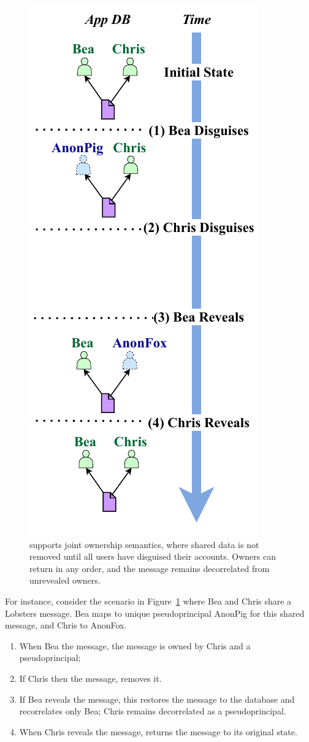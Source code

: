 \begin{figure}
    \centering
    \includegraphics[width=.4\textwidth]{figs/shared_hl}
    \caption[\sys supports joint ownership semantics when disguising shared data.]{\sys supports joint ownership semantics, where shared data is not
    removed until all users have disguised their accounts. Owners can return in
    any order, and the message remains decorrelated from unrevealed owners.}
\label{f:shared:hl}
\end{figure}

%
For instance, consider the scenario in Figure~\ref{f:shared:hl} where Bea and
Chris share a Lobsters message. Bea maps to unique pseudoprincipal AnonPig for this
shared message, and Chris to AnonFox.
\begin{enumerate}[nosep]
    \item[(1)] When Bea \xxs the message, the message is owned by
Chris and a pseudoprincipal;
    \item[(2)] If Chris then \xxs the message, \sys removes it.
    \item[(3)] If Bea reveals the message, this restores the message to the database
and recorrelates only Bea; Chris remains decorrelated as a pseudoprincipal.
\item[(4)] When Chris reveals the message, \sys returns
the message to its original state.
\end{enumerate}
%

